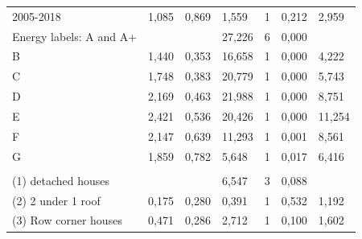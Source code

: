 \documentclass[preprint,12pt,3p]{elsarticle}
\begin{document}
\begin{footnotesize}
\begin{longtable}[c]{@{}lllllll@{}}
2005-2018                                                                                                                              & 1,085  & 0,869 & 1,559  & 1  & 0,212 & 2,959  \\
Energy labels: A and A+                                                                                                                &        &       & 27,226 & 6  & 0,000 &        \\
B                                                                                                                                      & 1,440  & 0,353 & 16,658 & 1  & 0,000 & 4,222  \\
C                                                                                                                                      & 1,748  & 0,383 & 20,779 & 1  & 0,000 & 5,743  \\
D                                                                                                                                      & 2,169  & 0,463 & 21,988 & 1  & 0,000 & 8,751  \\
E                                                                                                                                      & 2,421  & 0,536 & 20,426 & 1  & 0,000 & 11,254 \\
F                                                                                                                                      & 2,147  & 0,639 & 11,293 & 1  & 0,001 & 8,561  \\
G                                                                                                                                      & 1,859  & 0,782 & 5,648  & 1  & 0,017 & 6,416  \\
\begin{tabular}[c]{@{}l@{}}Type of single-family houses\_\\ (1) detached houses\end{tabular}                                           &        &       & 6,547  & 3  & 0,088 &        \\
(2) 2 under 1 roof                                                                                                                     & 0,175  & 0,280 & 0,391  & 1  & 0,532 & 1,192  \\
(3) Row corner houses                                                                                                                  & 0,471  & 0,286 & 2,712  & 1  & 0,100 & 1,602  \\

\end{longtable}
\end{footnotesize}
\end{document}
